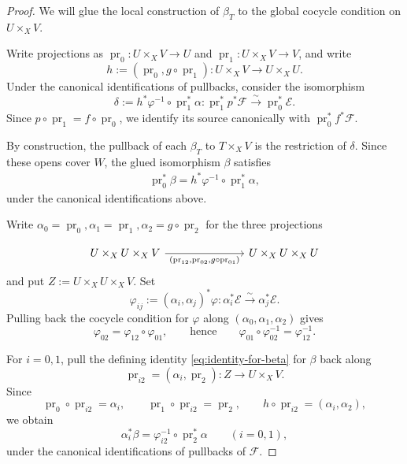 \begin{proof}
	
	
	We will glue the local construction of $\beta_T$ to the global cocycle condition on $U\times_X V$.
	
	Write projections as $\operatorname{pr}_0:U\times_X V\to U$ and
	$\operatorname{pr}_1:U\times_X V\to V$, and write
	\[
	h:=(\operatorname{pr}_0,g\circ\operatorname{pr}_1):
	U\times_X V\longrightarrow U\times_X U.
	\]
	Under the canonical identifications of pullbacks,
	consider the isomorphism
	\[
	\delta:=h^*\varphi^{-1}\circ\operatorname{pr}_1^*\alpha:
	\operatorname{pr}_1^*p^*\mathcal{F}
	\xrightarrow{\sim}
	\operatorname{pr}_0^*\mathcal{E}.
	\]
	Since $p\circ\operatorname{pr}_1
	=f\circ\operatorname{pr}_0$, we identify its source
	canonically with $\operatorname{pr}_0^*f^*\mathcal{F}$.
	
	By construction, the pullback of each $\beta_T$ to
	$T\times_X V$ is the restriction of $\delta$.
	Since these opens cover $W$, the glued isomorphism
	$\beta$ satisfies
	\begin{align}\label{eq:identity-for-beta}
		\operatorname{pr}_0^*\beta
		=
		h^*\varphi^{-1}\circ\operatorname{pr}_1^*\alpha,
	\end{align}
	under the canonical identifications above.
	
	Write $\alpha_0 = \operatorname{pr}_{0}, \alpha_1 = \operatorname{pr}_{1}, \alpha_2 =g\circ \operatorname{pr}_{2}$ for the three projections
	
	\[\begin{tikzcd}
		{U\times_XU\times_X V} &&& {U\times_XU\times_X U}
		\arrow["{(\operatorname{pr}_{12}, \operatorname{pr}_{02}, g\circ\operatorname{pr}_{01})}"', from=1-1, to=1-4]
	\end{tikzcd}\]
	and put $Z:=U\times_X U\times_X V$.
	Set
	\[
	\varphi_{ij}:=(\alpha_i,\alpha_j)^*\varphi:
	\alpha_i^*\mathcal{E}\xrightarrow{\sim}\alpha_j^*\mathcal{E}.
	\]
	Pulling back the cocycle condition for $\varphi$ along
	$(\alpha_0,\alpha_1,\alpha_2)$ gives
	\[
	\varphi_{02}=\varphi_{12}\circ\varphi_{01},
	\qquad\text{hence}\qquad
	\varphi_{01}\circ\varphi_{02}^{-1}
	=\varphi_{12}^{-1}.
	\]
	
	For $i=0,1$, pull the defining identity \ref{eq:identity-for-beta} for $\beta$
	back along
	\[
	\operatorname{pr}_{i2}
	=(\alpha_i,\operatorname{pr}_2):Z\longrightarrow U\times_X V.
	\]
	Since
	\[
	\operatorname{pr}_0\circ\operatorname{pr}_{i2}
	=\alpha_i,\qquad
	\operatorname{pr}_1\circ\operatorname{pr}_{i2}
	=\operatorname{pr}_2,\qquad
	h\circ\operatorname{pr}_{i2}=(\alpha_i,\alpha_2),
	\]
	we obtain
	\[
	\alpha_i^*\beta
	=
	\varphi_{i2}^{-1}\circ\operatorname{pr}_2^*\alpha
	\qquad(i=0,1),
	\]
	under the canonical identifications of pullbacks of
	$\mathcal{F}$.
	

\end{proof}
